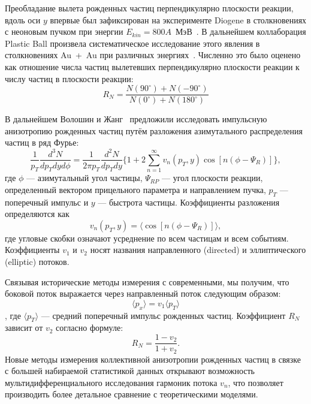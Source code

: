 Преобладание вылета рожденных частиц перпендикулярно плоскости реакции, вдоль оси $y$ впервые был зафиксирован на эксперименте Diogene в столкновениях с неоновым пучком при энергии $E_{kin}=800A$~МэВ~\cite{Demoulins:1990ac}.
В дальнейшем коллаборация Plastic Ball произвела систематическое исследование этого явления в столкновениях Au~+~Au при различных энергиях~\cite{Gustafsson:1984qh, Gutbrod:1988hh}.
Численно это было оценено как отношение числа частиц вылетевших перпендикулярно плоскости реакции к числу частиц в плоскости реакции:
\begin{equation}
    R_N = \frac{ N(90^{\circ} ) + N(-90^{\circ}) }{ N(0^{\circ}) + N(180^{\circ}) }
\end{equation}

В дальнейшем Волошин и Жанг~\cite{Voloshin:1994mz, Poskanzer:1998yz} предложили исследовать импульсную анизотропию рожденных частиц путём разложения азимутального распределения частиц в ряд Фурье:
%
\begin{equation}
    \frac{1}{p_T}\frac{d^3 N}{dp_T dy d\phi} = 
    \frac{ 1 }{2\pi p_T} \frac{ d^2 N }{dp_T dy} \{
    1 + 2\sum_{n=1}^{\infty} v_n(p_T,y) \cos[ n ( \phi - \Psi_R ) ]
    \},
\end{equation}
%
где $\phi$ --- азимутальный угол частицы, $\Psi_{RP}$ --- угол плоскости реакции, определенный вектором прицельного параметра и направлением пучка, $p_T$ --- поперечный импульс и $y$ --- быстрота частицы.
Коэффициенты разложения определяются как 
%
\begin{equation}
    v_n(p_T,y) = \langle  \cos[ n ( \phi - \Psi_R ) ] \rangle,
\end{equation}
%
где угловые скобки означают усреднение по всем частицам и всем событиям. 
Коэффициенты $v_1$ и $v_2$ носят названия направленного (directed) и эллиптического (elliptic) потоков.

Связывая исторические методы измерения с современными, мы получим, что боковой поток выражается через направленный поток следующим образом:
\begin{equation}
    \langle p_x \rangle = v_1 \langle p_T \rangle 
\end{equation},
где $\langle p_T \rangle $ --- средний поперечный импульс рожденных частиц.
Коэффициент $R_N$ зависит от $v_2$ согласно формуле:
\begin{equation}
    R_N = \frac{1 - v_2}{1 + v_2}.
\end{equation}
Новые методы измерения коллективной анизотропии рожденных частиц в связке с большей набираемой статистикой данных открывают возможность мультидифференциального исследования гармоник потока $v_n$, что позволяет производить более детальное сравнение с теоретическими моделями.

